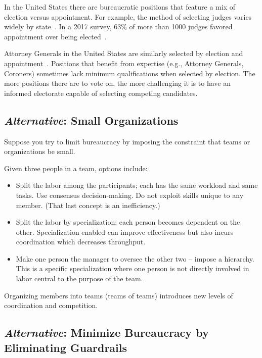 In the United States there are bureaucratic positions that feature a mix of election versus appointment. For example, the method of selecting judges varies widely by state~\cite{Ballotpedia_judicial_selection}. In a 2017 survey, 63\% of more than 1000 judges favored appointment over being elected~\cite{2017_Johnson}.


Attorney Generals in the United States are similarly  selected by election and appointment~\cite{2022_Ballotpedia}. Positions that benefit from expertise (e.g., Attorney Generals, Coroners) sometimes lack minimum qualifications when selected by election. The more positions there are to vote on, the more challenging it is to have an informed electorate capable of selecting competing candidates.

\subsection*{\textit{Alternative}: Small Organizations}

Suppose you try to limit bureaucracy by imposing the constraint that teams or organizations be small.

Given three people in a team, options include:
\begin{itemize}
    \item Split the labor among the participants; each has the same workload and same tasks. Use consensus decision-making. Do not exploit skills unique to any member. (That last concept is an inefficiency.)
    \item Split the labor by specialization; each person becomes dependent on the other. Specialization enabled can improve effectiveness but also incurs coordination which decreases throughput.
    \item Make one person the manager to oversee the other two -- impose a hierarchy. This is a specific  specialization where one person is not directly involved in labor central to the purpose of the team.
\end{itemize}
Organizing members into teams (teams of teams) introduces new levels of coordination and competition.

\subsection*{\textit{Alternative}: Minimize Bureaucracy by Eliminating Guardrails}

